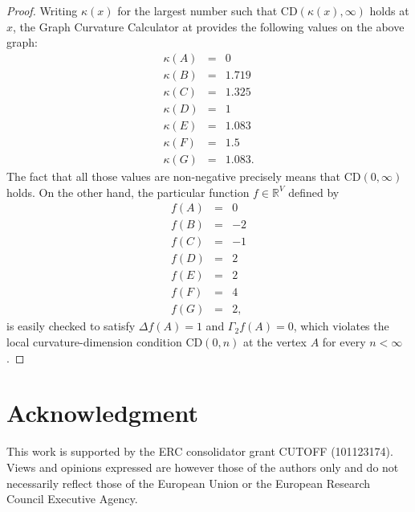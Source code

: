 \documentclass[12pt,final]{article}
\newcommand{\dR}{\mathbb {R}}
\newcommand{\CD}{\mathrm{CD}}
\begin{document}
\begin{proof}
Writing $\kappa(x)$ for the  largest number such that $\CD(\kappa(x),\infty)$ holds at  $x$, the Graph Curvature Calculator at \cite{MR4458133} provides the following values on the above graph:
\begin{eqnarray*}
\kappa(A) & = & 0 \\ 
\kappa(B) & = & 1.719\\
\kappa(C) & = & 1.325\\ 
\kappa(D) & = & 1\\
\kappa(E) & = & 1.083\\
\kappa(F) & = & 1.5\\
\kappa(G) & = & 1.083.
\end{eqnarray*}
The fact that all those values are non-negative precisely means that $\CD(0,\infty)$ holds. On the other hand, the particular function $f\in \dR^V$ defined by 
\begin{eqnarray*}
f(A) & = & 0\\
f(B) & = & -2\\
f(C) & = & -1\\
f(D) & = & 2\\
f(E) & = & 2\\
f(F) & = & 4\\
f(G) & = & 2,
\end{eqnarray*}
is easily checked to satisfy $\Delta f(A)=1$ and $\Gamma_2 f(A)=0$, which violates the local curvature-dimension condition $\CD(0,n)$ at the vertex $A$ for every $n<\infty$. 
\end{proof}


\section*{Acknowledgment}
This work is supported by the ERC consolidator grant CUTOFF (101123174). Views and
opinions expressed are however those of the authors only and do not necessarily reflect those
of the European Union or the European Research Council Executive Agency. 



\end{document}
